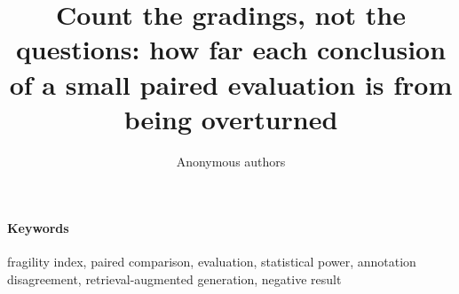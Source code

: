 \documentclass[11pt]{article}
\title{Count the gradings, not the questions: how far each conclusion of a small
paired evaluation is from being overturned}
\author{Anonymous authors}
\date{}
\numberwithin{equation}{section}
\begin{document}
\maketitle

\begin{abstract}

\end{abstract}

\paragraph{Keywords} fragility index, paired comparison, evaluation, statistical power, annotation disagreement, retrieval-augmented generation, negative result





\end{document}
